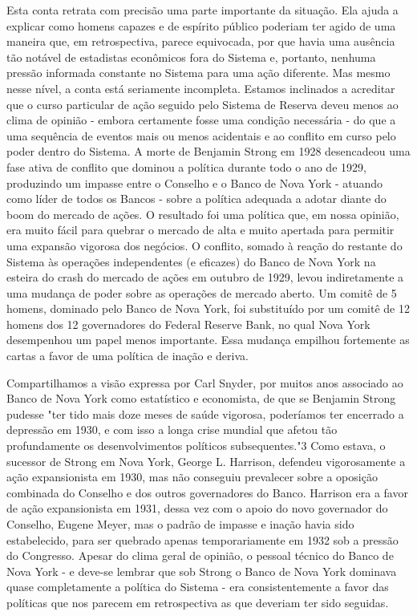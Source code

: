 \documentclass[12pt]{article}
\begin{document}
Esta conta retrata com precisão uma parte importante da situação. Ela ajuda a explicar como homens capazes e de espírito público poderiam ter agido de uma maneira que, em retrospectiva, parece equivocada, por que havia uma ausência tão notável de estadistas econômicos fora do Sistema e, portanto, nenhuma pressão informada constante no Sistema para uma ação diferente. Mas mesmo nesse nível, a conta está seriamente incompleta. Estamos inclinados a acreditar que o curso particular de ação seguido pelo Sistema de Reserva deveu menos ao clima de opinião - embora certamente fosse uma condição necessária - do que a uma sequência de eventos mais ou menos acidentais e ao conflito em curso pelo poder dentro do Sistema. A morte de Benjamin Strong em 1928 desencadeou uma fase ativa de conflito que dominou a política durante todo o ano de 1929, produzindo um impasse entre o Conselho e o Banco de Nova York - atuando como líder de todos os Bancos - sobre a política adequada a adotar diante do boom do mercado de ações. O resultado foi uma política que, em nossa opinião, era muito fácil para quebrar o mercado de alta e muito apertada para permitir uma expansão vigorosa dos negócios. O conflito, somado à reação do restante do Sistema às operações independentes (e eficazes) do Banco de Nova York na esteira do crash do mercado de ações em outubro de 1929, levou indiretamente a uma mudança de poder sobre as operações de mercado aberto. Um comitê de 5 homens, dominado pelo Banco de Nova York, foi substituído por um comitê de 12 homens dos 12 governadores do Federal Reserve Bank, no qual Nova York desempenhou um papel menos importante. Essa mudança empilhou fortemente as cartas a favor de uma política de inação e deriva.

Compartilhamos a visão expressa por Carl Snyder, por muitos anos associado ao Banco de Nova York como estatístico e economista, de que se Benjamin Strong pudesse "ter tido mais doze meses de saúde vigorosa, poderíamos ter encerrado a depressão em 1930, e com isso a longa crise mundial que afetou tão profundamente os desenvolvimentos políticos subsequentes."3 Como estava, o sucessor de Strong em Nova York, George L. Harrison, defendeu vigorosamente a ação expansionista em 1930, mas não conseguiu prevalecer sobre a oposição combinada do Conselho e dos outros governadores do Banco. Harrison era a favor de ação expansionista em 1931, dessa vez com o apoio do novo governador do Conselho, Eugene Meyer, mas o padrão de impasse e inação havia sido estabelecido, para ser quebrado apenas temporariamente em 1932 sob a pressão do Congresso. Apesar do clima geral de opinião, o pessoal técnico do Banco de Nova York - e deve-se lembrar que sob Strong o Banco de Nova York dominava quase completamente a política do Sistema - era consistentemente a favor das políticas que nos parecem em retrospectiva as que deveriam ter sido seguidas.
\end{document}
